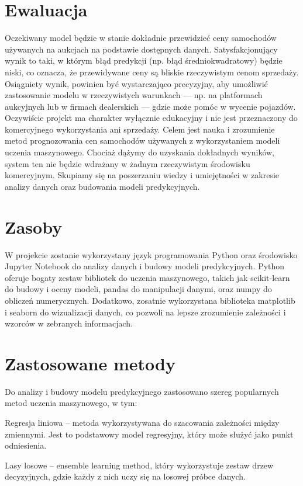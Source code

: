 \documentclass[10pt,letterpaper]{article}
\begin{document}
\section{Ewaluacja}
Oczekiwany model będzie w stanie dokładnie przewidzieć ceny samochodów używanych na aukcjach na podstawie dostępnych danych. Satysfakcjonujący wynik to taki, w którym błąd predykcji (np. błąd średniokwadratowy) będzie niski, co oznacza, że przewidywane ceny są bliskie rzeczywistym cenom sprzedaży. Osiągniety wynik, powinien być wystarczająco precyzyjny, aby umożliwić zastosowanie modelu w rzeczywistych warunkach — np. na platformach aukcyjnych lub w firmach dealerskich — gdzie może pomóc w wycenie pojazdów. Oczywiście projekt ma charakter wyłącznie edukacyjny i nie jest przeznaczony do komercyjnego wykorzystania ani sprzedaży. Celem jest nauka i zrozumienie metod prognozowania cen samochodów używanych z wykorzystaniem modeli uczenia maszynowego. Chociaż dążymy do uzyskania dokładnych wyników, system ten nie będzie wdrażany w żadnym rzeczywistym środowisku komercyjnym. Skupiamy się na poszerzaniu wiedzy i umiejętności w zakresie analizy danych oraz budowania modeli predykcyjnych.

\section{Zasoby}
W projekcie zostanie wykorzystany język programowania Python oraz środowisko Jupyter Notebook do analizy danych i budowy modeli predykcyjnych. Python oferuje bogaty zestaw bibliotek do uczenia maszynowego, takich jak scikit-learn do budowy i oceny modeli, pandas do manipulacji danymi, oraz numpy do obliczeń numerycznych. Dodatkowo, zosatnie wykorzystana biblioteka matplotlib i seaborn do wizualizacji danych, co pozwoli na lepsze zrozumienie zależności i wzorców w zebranych informacjach.

\section{Zastosowane metody}
Do analizy i budowy modelu predykcyjnego zastosowano szereg popularnych metod uczenia maszynowego, w tym:

Regresja liniowa – metoda wykorzystywana do szacowania zależności między zmiennymi. Jest to podstawowy model regresyjny, który może służyć jako punkt odniesienia.

Lasy losowe – ensemble learning method, który wykorzystuje zestaw drzew decyzyjnych, gdzie każdy z nich uczy się na losowej próbce danych.
\end{document}
